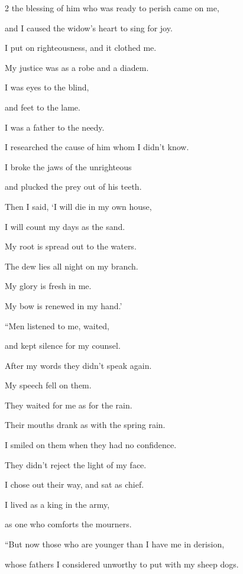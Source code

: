\begin{multicols}{2}
	\myverse{}the blessing of him who was ready to perish came on me,
	
	and I caused the widow’s heart to sing for joy.
	
	\myverse{}I put on righteousness, and it clothed me.
	
	My justice was as a robe and a diadem.
	
	\myverse{}I was eyes to the blind,
	
	and feet to the lame.
	
	\myverse{}I was a father to the needy.
	
	I researched the cause of him whom I didn’t know.
	
	\myverse{}I broke the jaws of the unrighteous
	
	and plucked the prey out of his teeth.
	
	\myverse{}Then I said, ‘I will die in my own house,
	
	I will count my days as the sand.
	
	\myverse{}My root is spread out to the waters.
	
	The dew lies all night on my branch.
	
	\myverse{}My glory is fresh in me.
	
	My bow is renewed in my hand.’
	
		\vspace{\baselineskip}
	
	\myverse{}“Men listened to me, waited,
	
	and kept silence for my counsel.
	
	\myverse{}After my words they didn’t speak again.
	
	My speech fell on them.
	
	\myverse{}They waited for me as for the rain.
	
	Their mouths drank as with the spring rain.
	
	\myverse{}I smiled on them when they had no confidence.
	
	They didn’t reject the light of my face.
	
	\myverse{}I chose out their way, and sat as chief.
	
	I lived as a king in the army,
	
	as one who comforts the mourners.
	
	
	
	
	\mychapter{} \myverse*{}“But now those who are younger than I have me in derision,
	
	\quad\quad whose fathers I considered unworthy to put with my sheep dogs.
	

\end{multicols}
